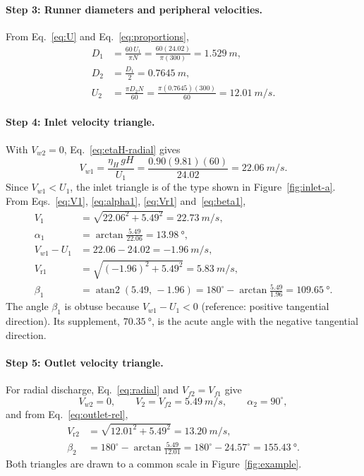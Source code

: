 \documentclass[11pt,a4paper]{article}
\numberwithin{equation}{section}
\newcommand{\vr}{\mathrm{r}}
\begin{document}
\paragraph{Step 3: Runner diameters and peripheral velocities.} From Eq.~\eqref{eq:U} and Eq.~\eqref{eq:proportions},
\begin{align}
  D_1 &= \frac{60\,U_1}{\pi N} = \frac{60(24.02)}{\pi(300)} = \SI{1.529}{m}, \label{eq:ex-D1}\\
  D_2 &= \frac{D_1}{2} = \SI{0.7645}{m}, \label{eq:ex-D2}\\
  U_2 &= \frac{\pi D_2 N}{60} = \frac{\pi(0.7645)(300)}{60} = \SI{12.01}{m/s}. \label{eq:ex-U2}
\end{align}

\paragraph{Step 4: Inlet velocity triangle.} With $V_{w2}=0$, Eq.~\eqref{eq:etaH-radial} gives
\begin{equation}
  V_{w1} = \frac{\eta_H\,gH}{U_1} = \frac{0.90(9.81)(60)}{24.02} = \SI{22.06}{m/s}.
  \label{eq:ex-Vw1}
\end{equation}
Since $V_{w1} < U_1$, the inlet triangle is of the type shown in Figure~\ref{fig:inlet-a}. From Eqs.~\eqref{eq:V1}, \eqref{eq:alpha1}, \eqref{eq:Vr1} and~\eqref{eq:beta1},
\begin{align}
  V_1 &= \sqrt{22.06^{2} + 5.49^{2}} = \SI{22.73}{m/s}, \label{eq:ex-V1}\\
  \alpha_1 &= \arctan\frac{5.49}{22.06} = \SI{13.98}{\degree}, \label{eq:ex-alpha1}\\
  V_{w1} - U_1 &= 22.06 - 24.02 = \SI{-1.96}{m/s}, \label{eq:ex-diff}\\
  V_{\vr 1} &= \sqrt{(-1.96)^{2} + 5.49^{2}} = \SI{5.83}{m/s}, \label{eq:ex-Vr1}\\
  \beta_1 &= \operatorname{atan2}(5.49,\,-1.96) = 180^\circ - \arctan\frac{5.49}{1.96} = \SI{109.65}{\degree}. \label{eq:ex-beta1}
\end{align}
The angle $\beta_1$ is obtuse because $V_{w1}-U_1<0$ (reference: positive tangential direction). Its supplement, $\SI{70.35}{\degree}$, is the acute angle with the negative tangential direction.

\paragraph{Step 5: Outlet velocity triangle.} For radial discharge, Eq.~\eqref{eq:radial} and $V_{f2} = V_{f1}$ give
\begin{equation}
  V_{w2} = 0, \qquad V_2 = V_{f2} = \SI{5.49}{m/s}, \qquad \alpha_2 = 90^\circ,
  \label{eq:ex-V2}
\end{equation}
and from Eq.~\eqref{eq:outlet-rel},
\begin{align}
  V_{\vr 2} &= \sqrt{12.01^{2} + 5.49^{2}} = \SI{13.20}{m/s}, \label{eq:ex-Vr2}\\
  \beta_2 &= 180^\circ - \arctan\frac{5.49}{12.01} = 180^\circ - 24.57^\circ = \SI{155.43}{\degree}. \label{eq:ex-beta2}
\end{align}
Both triangles are drawn to a common scale in Figure~\ref{fig:example}.
\end{document}
